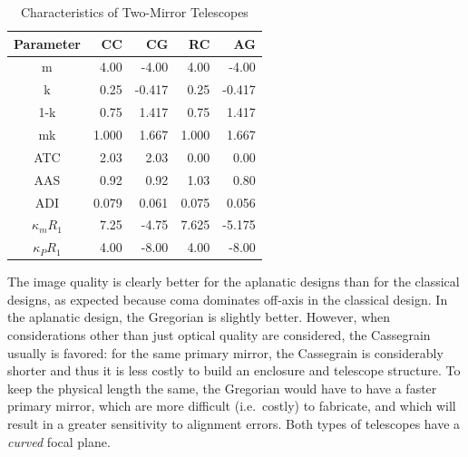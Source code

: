 \documentclass[12pt]{article}
\begin{document}
\begin{table}[h]
\centering
\begin{tabular}{c r r r r}
Parameter & CC & CG & RC & AG\\
\hline\hline
m & 4.00 & -4.00 & 4.00 & -4.00\\
k & 0.25 & -0.417 & 0.25 & -0.417\\
1-k & 0.75 & 1.417 & 0.75 & 1.417\\
mk & 1.000 & 1.667 & 1.000 & 1.667\\
ATC & 2.03 & 2.03 & 0.00 & 0.00\\
AAS & 0.92 & 0.92 & 1.03 & 0.80\\
ADI & 0.079 & 0.061 & 0.075 & 0.056\\
$\kappa_{m}R_{1}$ & 7.25 & -4.75 & 7.625 & -5.175\\
$\kappa_{P}R_{1}$ & 4.00 & -8.00 & 4.00 & -8.00\\
\hline
\end{tabular}
\caption{Characteristics of Two-Mirror Telescopes}
\end{table}

The image quality is clearly better for the aplanatic designs than for
the classical designs, as expected because coma dominates off-axis in
the classical design. In the aplanatic design, the Gregorian is
slightly better. However, when considerations other than just optical
quality are considered, the Cassegrain usually is favored: for the
same primary mirror, the Cassegrain is considerably shorter and thus
it is less costly to build an enclosure and telescope structure. To
keep the physical length the same, the Gregorian would have to have a
faster primary mirror, which are more difficult (i.e.\ costly) to
fabricate, and which will result in a greater sensitivity to alignment
errors. Both types of telescopes have a \emph{curved} focal plane.
\end{document}

